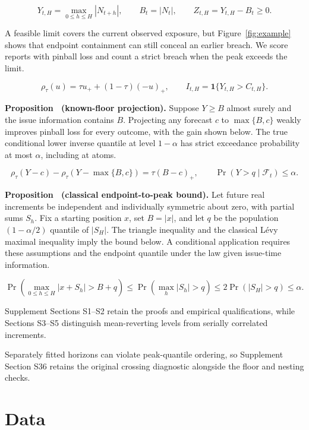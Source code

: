 \documentclass[11pt,a4paper]{article}
\newcounter{proposition}
\begin{document}
\[
Y_{t,H}=\max_{0\le h\le H}|N_{t+h}|,\qquad B_t=|N_t|,\qquad Z_{t,H}=Y_{t,H}-B_t\ge0.
\]

A feasible limit covers the current observed exposure, but Figure~\ref{fig:example} shows that endpoint containment can still conceal an earlier breach. We score reports with pinball loss and count a strict breach when the peak exceeds the limit.


\[
\rho_\tau(u)=\tau u_+ +(1-\tau)(-u)_+,\qquad I_{t,H}=\mathbf 1\{Y_{t,H}>C_{t,H}\}.
\]

\noindent\textbf{Proposition~\theproposition{} (known-floor projection).}\label{prop:floor} Suppose \(Y\ge B\) almost surely and the issue information contains \(B\). Projecting any forecast \(c\) to \(\max\{B,c\}\) weakly improves pinball loss for every outcome, with the gain shown below. The true conditional lower inverse quantile at level \(1-\alpha\) has strict exceedance probability at most \(\alpha\), including at atoms.


\[
\rho_\tau(Y-c)-\rho_\tau(Y-\max\{B,c\})=\tau(B-c)_+,\qquad \Pr(Y>q\mid\mathcal F_t)\le\alpha.
\]

\noindent\textbf{Proposition~\theproposition{} (classical endpoint-to-peak bound).}\label{prop:levy} Let future real increments be independent and individually symmetric about zero, with partial sums \(S_h\). Fix a starting position \(x\), set \(B=|x|\), and let \(q\) be the population \((1-\alpha/2)\) quantile of \(|S_H|\). The triangle inequality and the classical L\'evy maximal inequality imply the bound below. A conditional application requires these assumptions and the endpoint quantile under the law given issue-time information.


\[
\Pr\!\left(\max_{0\le h\le H}|x+S_h|>B+q\right)\le\Pr\!\left(\max_h|S_h|>q\right)\le2\Pr(|S_H|>q)\le\alpha.
\]

Supplement Sections S1--S2 retain the proofs and empirical qualifications, while Sections S3--S5 distinguish mean-reverting levels from serially correlated increments.


Separately fitted horizons can violate peak-quantile ordering, so Supplement Section S36 retains the original crossing diagnostic alongside the floor and nesting checks.


\FloatBarrier

\section{Data}\label{sec:data}
\end{document}
